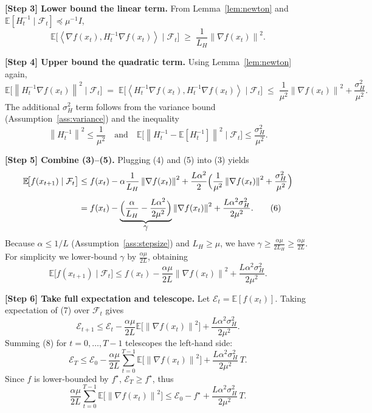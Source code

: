 \documentclass{article}
\newcommand{\E}{\mathbb{E}}
\newcommand{\norm}[1]{\left\lVert #1 \right\rVert}
\newcommand{\ip}[2]{\left\langle #1, #2 \right\rangle}
\begin{document}
\noindent\textbf{[Step 3] Lower bound the linear term.}  
From Lemma~\ref{lem:newton} and $\E[H_{t}^{-1}\mid\mathcal{F}_{t}]\preceq \mu^{-1}I$,
\[
\E\!\bigl[\ip{\nabla f(x_{t})}{H_{t}^{-1}\nabla f(x_{t})}\mid\mathcal{F}_{t}\bigr]
\;\ge\;\frac{1}{L_{H}}\norm{\nabla f(x_{t})}^{2}.
\tag{4}
\]

\noindent\textbf{[Step 4] Upper bound the quadratic term.}  
Using Lemma~\ref{lem:newton} again,
\[
\E\!\bigl[\norm{H_{t}^{-1}\nabla f(x_{t})}^{2}\mid\mathcal{F}_{t}\bigr]
\;=\;\E\!\bigl[\ip{H_{t}^{-1}\nabla f(x_{t})}{H_{t}^{-1}\nabla f(x_{t})}\mid\mathcal{F}_{t}\bigr]
\;\le\;\frac{1}{\mu^{2}}\norm{\nabla f(x_{t})}^{2}
     +\frac{\sigma_{H}^{2}}{\mu^{2}}.
\tag{5}
\]
The additional $\sigma_{H}^{2}$ term follows from the variance bound (Assumption~\ref{ass:variance}) and the inequality
\[
\norm{H_{t}^{-1}}^{2}
\le \frac{1}{\mu^{2}} \quad\text{and}\quad
\E\!\bigl[\norm{H_{t}^{-1} - \E[H_{t}^{-1}]\!}^{2}\mid\mathcal{F}_{t}\bigr]\le \frac{\sigma_{H}^{2}}{\mu^{2}}.
\]

\noindent\textbf{[Step 5] Combine (3)–(5).}  
Plugging (4) and (5) into (3) yields
\begin{align}
\E\!\bigl[f(x_{t+1})\mid\mathcal{F}_{t}\bigr]
&\le f(x_{t})
-\alpha\frac{1}{L_{H}}\norm{\nabla f(x_{t})}^{2}
+\frac{L\alpha^{2}}{2}\Bigl(\frac{1}{\mu^{2}}\norm{\nabla f(x_{t})}^{2}
+\frac{\sigma_{H}^{2}}{\mu^{2}}\Bigr) \nonumber\\[4pt]
&= f(x_{t})
-\underbrace{\Bigl(\frac{\alpha}{L_{H}}-\frac{L\alpha^{2}}{2\mu^{2}}\Bigr)}_{\displaystyle\gamma}
   \norm{\nabla f(x_{t})}^{2}
+\frac{L\alpha^{2}\sigma_{H}^{2}}{2\mu^{2}}.
\tag{6}
\end{align}
Because $\alpha\le 1/L$ (Assumption~\ref{ass:stepsize}) and $L_{H}\ge\mu$, we have $\gamma\ge \frac{\alpha\mu}{2L_{H}}\ge \frac{\alpha\mu}{2L}$. For simplicity we lower‑bound $\gamma$ by $\frac{\alpha\mu}{2L}$, obtaining
\[
\E\!\bigl[f(x_{t+1})\mid\mathcal{F}_{t}\bigr]
\le f(x_{t})-\frac{\alpha\mu}{2L}\norm{\nabla f(x_{t})}^{2}
+\frac{L\alpha^{2}\sigma_{H}^{2}}{2\mu^{2}}.
\tag{7}
\]

\noindent\textbf{[Step 6] Take full expectation and telescope.}  
Let $\mathcal{E}_{t}=\E[f(x_{t})]$. Taking expectation of (7) over $\mathcal{F}_{t}$ gives
\[
\mathcal{E}_{t+1}\le \mathcal{E}_{t}
-\frac{\alpha\mu}{2L}\E\!\bigl[\norm{\nabla f(x_{t})}^{2}\bigr]
+\frac{L\alpha^{2}\sigma_{H}^{2}}{2\mu^{2}}.
\tag{8}
\]
Summing (8) for $t=0,\dots,T-1$ telescopes the left‑hand side:
\[
\mathcal{E}_{T}\le \mathcal{E}_{0}
-\frac{\alpha\mu}{2L}\sum_{t=0}^{T-1}\E\!\bigl[\norm{\nabla f(x_{t})}^{2}\bigr]
+ \frac{L\alpha^{2}\sigma_{H}^{2}}{2\mu^{2}}\,T.
\tag{9}
\]
Since $f$ is lower‑bounded by $f^{\star}$, $\mathcal{E}_{T}\ge f^{\star}$, thus
\[
\frac{\alpha\mu}{2L}\sum_{t=0}^{T-1}\E\!\bigl[\norm{\nabla f(x_{t})}^{2}\bigr]
\le \mathcal{E}_{0}-f^{\star}
+ \frac{L\alpha^{2}\sigma_{H}^{2}}{2\mu^{2}}\,T .
\tag{10}
\]
\end{document}
